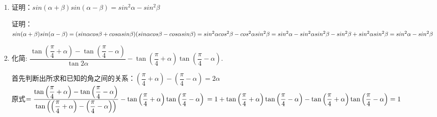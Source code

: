 \begin{enumerate}
    \begin{jieda}
        $tan(\alpha + \beta) = \dfrac{\frac{1}{7} + \frac{3}{4}}{1 - \frac{1}{7} \cdot \frac{3}{4}} = 1$ 
        \begin{enumerate}
            \item $\alpha + \beta = k\pi + \dfrac{\pi}{4}, k \in \mathbf{Z}$
            \item $\alpha + \beta = \dfrac{\pi}{4}$
            \item $\alpha \in \left(0, \dfrac{\pi}{4}\right), \beta \in \left(0, \dfrac{\pi}{4}\right) \cup \left(\pi, \dfrac{5\pi}{4}\right)$，$\alpha$一解，$\beta$两解，故$\alpha + \beta = \dfrac{\pi}{4}$或$\dfrac{5\pi}{4}$
        \end{enumerate}
    \end{jieda}
    \item 证明：$sin(\alpha+\beta)sin(\alpha-\beta) = sin^2\alpha - sin^2\beta$
    \begin{jieda}
        证明：\\
        $sin(\alpha+\beta)sin(\alpha-\beta) \\
        = (sin\alpha cos\beta + cos\alpha sin\beta)(sin\alpha cos\beta - cos\alpha sin\beta) \\
        = sin^2\alpha cos^2\beta - cos^2\alpha sin^2\beta \\
        = sin^2\alpha - sin^2\alpha sin^2\beta - sin^2\beta + sin^2\alpha sin^2\beta \\
        = sin^2\alpha - sin^2\beta$
    \end{jieda}
    \item 化简: $\dfrac{\tan\left(\dfrac{\pi}{4}+\alpha\right)-\tan\left(\dfrac{\pi}{4}-\alpha\right)}{\tan2\alpha}-\tan\left(\dfrac{\pi}{4}+\alpha\right)\tan\left(\dfrac{\pi}{4}-\alpha\right)$.
    \begin{jieda}
        首先判断出所求和已知的角之间的关系：$\left(\dfrac{\pi}{4}+\alpha\right) - \left(\dfrac{\pi}{4}-\alpha\right) = 2\alpha$ \\
        原式$ = \dfrac{\tan\left(\dfrac{\pi}{4}+\alpha\right)-\tan\left(\dfrac{\pi}{4}-\alpha\right)}{\tan\left(\left(\dfrac{\pi}{4}+\alpha\right) - \left(\dfrac{\pi}{4}-\alpha\right)\right)}-\tan\left(\dfrac{\pi}{4}+\alpha\right)\tan\left(\dfrac{\pi}{4}-\alpha\right) \\
        = 1 + \tan\left(\dfrac{\pi}{4}+\alpha\right)\tan\left(\dfrac{\pi}{4}-\alpha\right) -\tan\left(\dfrac{\pi}{4}+\alpha\right)\tan\left(\dfrac{\pi}{4}-\alpha\right) = 1$
    \end{jieda}

\end{enumerate}
